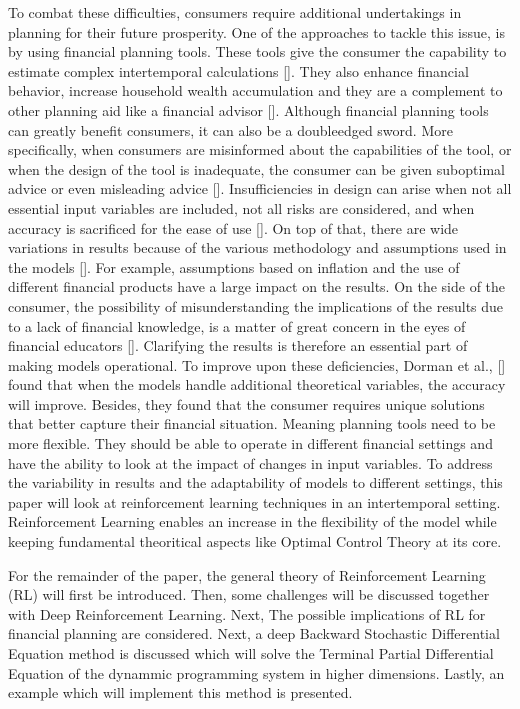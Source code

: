 \documentclass[letterpaper,10pt,english]{jupyterBook}
\begin{document}
\sphinxAtStartPar
To combat these difficulties, consumers require additional undertakings in planning for their future prosperity. One of the approaches to tackle this issue, is by using financial planning tools. These tools give the consumer the capability to estimate complex intertemporal calculations {[}{]}. They also enhance financial behavior, increase household wealth accumulation and they are a complement to other planning aid like a financial advisor {[}{]}. Although financial planning tools can greatly benefit consumers, it can also be a double\sphinxhyphen{}edged sword. More specifically, when consumers are misinformed about the capabilities of the tool, or when the design of the tool is inadequate, the consumer can be given sub\sphinxhyphen{}optimal advice or even misleading advice {[}{]}. Insufficiencies in design can arise when not all essential input variables are included, not all risks are considered, and when accuracy is sacrificed for the ease of use {[}{]}. On top of that, there are wide variations in results because of the various methodology and assumptions used in the models {[}{]}. For example, assumptions based on inflation and the use of different financial products have a large impact on the results. On the side of the consumer, the possibility of misunderstanding the implications of the results due to a lack of financial knowledge, is a matter of great concern in the eyes of financial educators {[}{]}. Clarifying the results is therefore an essential part of making models operational. To improve upon these deficiencies, Dorman et al., {[}{]} found that when the models handle additional theoretical variables, the accuracy will improve. Besides, they found that the consumer requires unique solutions that better capture their financial situation. Meaning planning tools need to be more flexible. They should be able to operate in different financial settings and have the ability to look at the impact of changes in input variables. To address the variability in results and the adaptability of models to different settings, this paper will look at reinforcement learning techniques in an intertemporal setting. Reinforcement Learning enables an increase in the flexibility of the model while keeping fundamental theoritical aspects like Optimal Control Theory at its core.

\sphinxAtStartPar
For the remainder of the paper, the general theory of Reinforcement Learning (RL) will first be introduced. Then, some challenges will be discussed together with Deep Reinforcement Learning. Next, The possible implications of RL for financial planning are considered.  Next, a deep Backward Stochastic Differential Equation method is discussed which will solve the Terminal Partial Differential Equation of the dynammic programming system in higher dimensions. Lastly, an example which will implement this method is presented.
\end{document}
